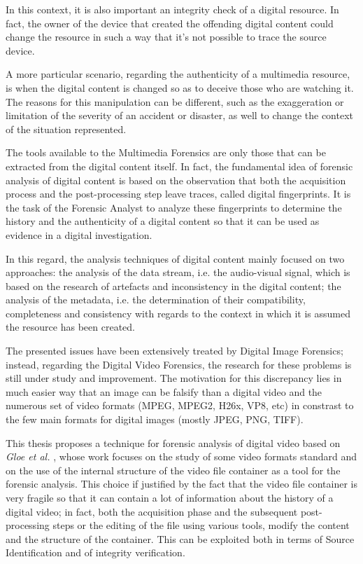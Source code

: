 In this context, it is also important an integrity check of a digital resource. In fact, the owner of the device that created the offending digital content could change the resource in such a way that it's not possible to trace the source device.

A more particular scenario, regarding the authenticity of a multimedia resource, is when the digital content is changed so as to deceive those who are watching it. The reasons for this manipulation can be different, such as the exaggeration or limitation of the severity of an accident or disaster, as well to change the context of the situation represented.

The tools available to the Multimedia Forensics are only those that can be extracted from the digital content itself. In fact, the fundamental idea of forensic analysis of digital content is based on the observation that both the acquisition process and the post-processing step leave traces, called digital fingerprints. It is the task of the Forensic Analyst to analyze these fingerprints to determine the history and the authenticity of a digital content so that it can be used as evidence in a digital investigation.

In this regard, the analysis techniques of digital content mainly focused on two approaches: the analysis of the data stream, i.e. the audio-visual signal, which is based on the research of artefacts and inconsistency in the digital content; the analysis of the metadata, i.e. the determination of their compatibility, completeness and consistency with regards to the context in which it is assumed the resource has been created.

The presented issues have been extensively treated by Digital Image Forensics; instead, regarding the Digital Video Forensics, the research for these problems is still under study and improvement. The motivation for this discrepancy lies in much easier way that an image can be falsify than a digital video and the numerous set of video formats (MPEG, MPEG2, H26x, VP8, etc) in constrast to the few main formats for digital images (mostly JPEG, PNG, TIFF).

This thesis proposes a technique for forensic analysis of digital video based on \emph{Gloe et al.} \cite{Gloe2014S68}, whose work focuses on the study of some video formats standard and on the use of the internal structure of the video file container as a tool for the forensic analysis. This choice if justified by the fact that the video file container is very fragile so that it can contain a lot of information about the history of a digital video; in fact, both the acquisition phase and the subsequent post-processing steps or the editing of the file using various tools, modify the content and the structure of the container. This can be exploited both in terms of Source Identification and of integrity verification.

